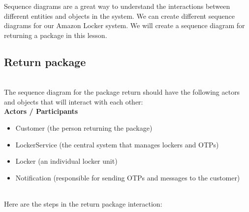 

Sequence diagrams are a great way to understand the interactions between different entities and objects in the system. We can create different sequence diagrams for our Amazon Locker system. We will create a sequence diagram for returning a package in this lesson.

\subsection{Return package}\label{VGX1aCapGu5xp6wNV0JSj}
\\
The sequence diagram for the package return should have the following actors and objects that will interact with each other:
\\
\textbf{Actors / Participants}

\begin{itemize}
\item
\protect{}\label{ATBX5-0xOFVUVrQ_LIRfp}
Customer (the person returning the package)
\item
\protect{}\label{Ar1sJHHkLSFq79YKLIlOy}
LockerService (the central system that manages lockers and OTPs)
\item
\protect{}\label{6ge_YlvHqB9_TEc-BBzDD}
Locker (an individual locker unit)
\item
\protect{}\label{voqir6xc6Siep1iX4nkXE}
Notification (responsible for sending OTPs and messages to the customer)
\end{itemize}
\\
Here are the steps in the return package interaction:

